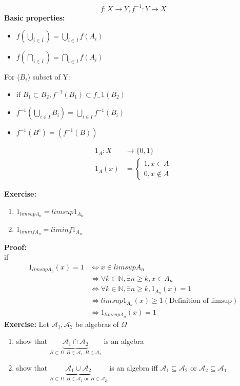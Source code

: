 $$
    f:X\rightarrow Y, f^{-1}:Y\rightarrow X
$$ 
\textbf{Basic properties:}
\begin{itemize}
\item $f(\bigcup_{i\in I})=\bigcup_{i\in I}f(A_i)$
\item $f(\bigcap_{i\in I})=\bigcap_{i\in I}f(A_i)$
\end{itemize}
For ($ B_i $) subset of Y:
\begin{itemize}
\item if $ B_1 \subset B_2, f^{-1}(B_1)\subset f_-1(B_2)$
\item $ f^{-1}(\bigcup_{i\in I}B_i)=\bigcup_{i\in I}f^{-1}(B_i)$ 
\item $f^{-1}(B^c)=(f^{-1}(B))$
\end{itemize}
\begin{definition}{}
\begin{align*}
    1_A:X &\rightarrow \{0,1\}
    \\1_A(x)&=\begin{cases}
        1, x\in A
        \\0, x\notin A
    \end{cases}
\end{align*}
\end{definition}
\textbf{Exercise:}
\begin{enumerate}
    \item $1_{limsup{A_n}}=limsup{1_{A_n}}$
    \item $1_{liminf{A_n}}=liminf{1_{A_n}}$
    \end{enumerate}
\textbf{Proof:}
\\if \begin{align*}
    1_{limsup{A_n}}(x)=1 &\Leftrightarrow x\in limsup{A_n}
    \\&\Leftrightarrow \forall k\in \mathbb{N}, \exists n\geq k, x\in A_n
    \\&\Leftrightarrow \forall k\in \mathbb{N}, \exists n\geq k, 1_{A_n}(x)=1
    \\&\Leftrightarrow limsup{1_{A_n}}(x)\geq1 (\text{Definition of limsup})
    \\&\Leftrightarrow 1_{limsup{A_n}}(x)=1
\end{align*}
\textbf{Exercise:}
Let $ \mathcal{A}_1,\mathcal{A}_2  $ be algebras of $\Omega$
\begin{enumerate}
    \item show that $\underbrace{\mathcal{A}_1\cap \mathcal{A}_2}_{B\subset\Omega:B\in \mathcal{A}_1,B\in \mathcal{A}_2} $ is an algebra
    \item show that $ \underbrace{\mathcal{A}_1\cup \mathcal{A}_2}_{B\subset\Omega:B\in \mathcal{A}_1\text{ or }B\in \mathcal{A}_2} $ is an algebra iff $ \mathcal{A}_1\subseteq \mathcal{A}_2 $ or $ \mathcal{A}_2\subseteq \mathcal{A}_1 $
\end{enumerate}
